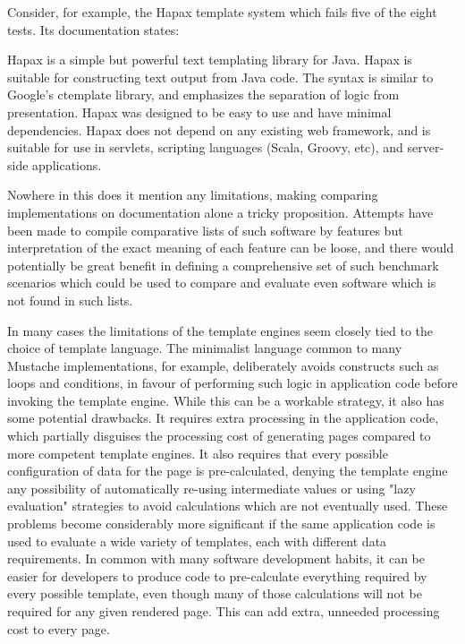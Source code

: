 Consider, for example, the Hapax template system which fails five of the eight tests. Its documentation states:

\begin{displayquote}
Hapax is a simple but powerful text templating library for Java. Hapax is suitable for constructing text output from Java code. The syntax is similar to Google's ctemplate library, and emphasizes the separation of logic from presentation. Hapax was designed to be easy to use and have minimal dependencies. Hapax does not depend on any existing web framework, and is suitable for use in servlets, scripting languages (Scala, Groovy, etc), and server-side applications. \citep{Hapax2018}
\end{displayquote}

Nowhere in this does it mention any limitations, making comparing implementations on documentation alone a tricky proposition. Attempts have been made to compile comparative lists of such software by features \citep{Wikipedia2018} but interpretation of the exact meaning of each feature can be loose, and there would potentially be great benefit in defining a comprehensive set of such benchmark scenarios which could be used to compare and evaluate even software which is not found in such lists.

In many cases the limitations of the template engines seem closely tied to the choice of template language. The minimalist language common to many Mustache implementations, for example, deliberately avoids constructs such as loops and conditions, in favour of performing such logic in application code before invoking the template engine. While this can be a workable strategy, it also has some potential drawbacks. It requires extra processing in the application code, which partially disguises the processing cost of generating pages compared to more competent template engines. It also requires that every possible configuration of data for the page is pre-calculated, denying the template engine any possibility of automatically re-using intermediate values or using "lazy evaluation" strategies to avoid calculations which are not eventually used. These problems become considerably more significant if the same application code is used to evaluate a wide variety of templates, each with different data requirements. In common with many software development habits, it can be easier for developers to produce code to pre-calculate everything required by every possible template, even though many of those calculations will not be required for any given rendered page. This can add extra, unneeded processing cost to every page.

